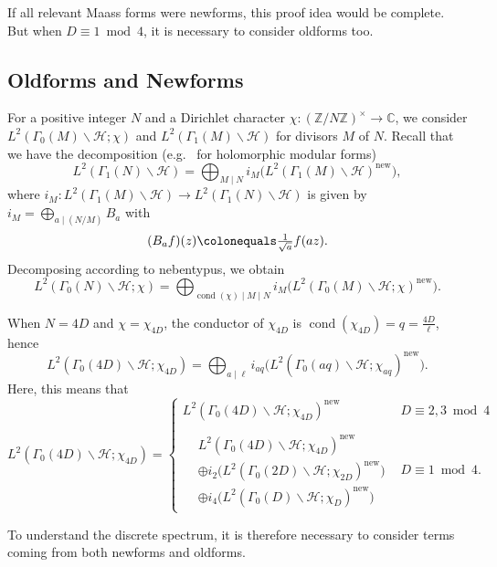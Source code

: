 \documentclass[11pt,reqno,oneside]{amsart}
\theoremstyle{plain}
\theoremstyle{definition}
\DeclareMathOperator{\new}{new}
\DeclareMathOperator{\cond}{cond}
\newcommand{\C}{\mathbb{C}}
\newcommand{\Z}{\mathbb{Z}}
\newcommand{\chid}{\chi_{4D}}
\newcommand{\Szero}[2]{L^2(\Gamma_0(#1)\backslash\mathcal{H}; #2)}
\newcommand{\Sone}[1]{L^2(\Gamma_1(#1)\backslash\mathcal{H})}
\begin{document}
If all relevant Maass forms were newforms, this proof idea would be complete.
But when $D \equiv 1 \bmod 4$, it is necessary to consider oldforms too.

\subsection*{Oldforms and Newforms}

For a positive integer $N$ and a Dirichlet character
$\chi: (\Z / N \Z)^{\times} \to \C$, we consider $\Szero{M}{\chi}$ and $\Sone{M}$ for
divisors $M$ of $N$.
Recall that we have the decomposition (e.g.~\cite[Thm~5.8.3]{diamond2005first}
for holomorphic modular forms)
\[
  \Sone{N} = \bigoplus_{M \mid N} i_M\bigl(\Sone{M}^{\new}\bigr),
\]
where $i_M: \Sone{M} \to \Sone{N}$ is given
by $i_M = \bigoplus_{a \mid (N/M)} B_a$ with
\begin{equation}\label{eq: level raising definition}
  (B_a f)(z) \colonequals \tfrac{1}{\sqrt{a}} f(az).
\end{equation}
Decomposing according to nebentypus, we obtain
\[
  \Szero{N}{\chi}
  =
  \bigoplus_{\cond(\chi) \mid M \mid N} i_M\bigl(\Szero{M}{\chi}^{\new}\bigr).
\]

When $N = 4D$ and $\chi = \chi_{4D}$, the conductor of $\chi_{4D}$ is
$\cond(\chi_{4D}) = q = \tfrac{4D}{\ell}$, hence
\[
  \Szero{4D}{\chi_{4D}}
  =
  \bigoplus_{a \mid \ell} i_{aq}\bigl(\Szero{aq}{\chi_{aq}}^{\new}\bigr).
\]
Here, this means that
\begin{equation}\label{eq:S0new}
  \Szero{4D}{\chid}
  = \begin{cases}
    \Szero{4D}{\chid}^{\new} & D \equiv 2,3 \bmod 4 \\
    \\
    \begin{aligned}
       & \Szero{4D}{\chi_{4D}}^{\new}
      \\
       & \oplus i_2\bigl(\Szero{2D}{\chi_{2D}}^{\new}\bigr)
      \\
       & \oplus i_4\bigl(\Szero{D}{\chi_D}^{\new}\bigr)
    \end{aligned}
                             & D \equiv 1 \bmod 4.
  \end{cases}
\end{equation}


To understand the discrete spectrum, it is therefore necessary to consider terms coming from both newforms and oldforms.
\end{document}
